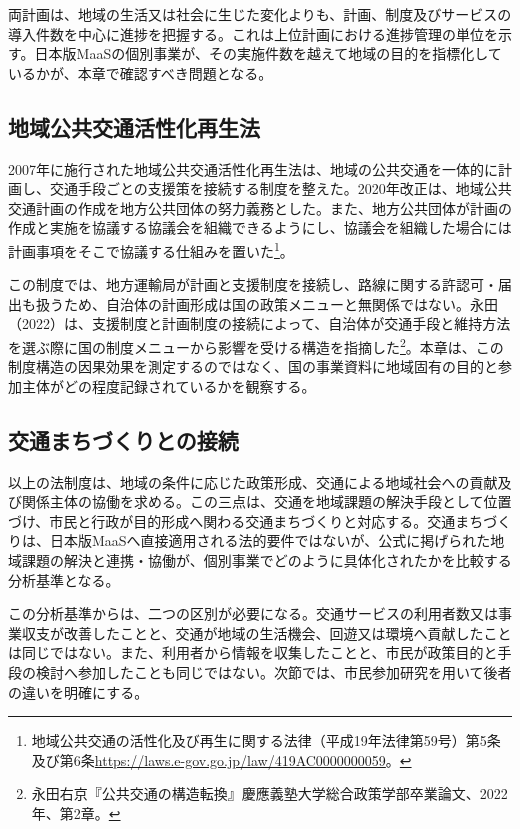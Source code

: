 両計画は、地域の生活又は社会に生じた変化よりも、計画、制度及びサービスの導入件数を中心に進捗を把握する。これは上位計画における進捗管理の単位を示す。日本版MaaSの個別事業が、その実施件数を越えて地域の目的を指標化しているかが、本章で確認すべき問題となる。

\subsection{地域公共交通活性化再生法}
\label{subsec:ch4_revitalization_law}

2007年に施行された地域公共交通活性化再生法は、地域の公共交通を一体的に計画し、交通手段ごとの支援策を接続する制度を整えた。2020年改正は、地域公共交通計画の作成を地方公共団体の努力義務とした。また、地方公共団体が計画の作成と実施を協議する協議会を組織できるようにし、協議会を組織した場合には計画事項をそこで協議する仕組みを置いた\footnote{地域公共交通の活性化及び再生に関する法律（平成19年法律第59号）第5条及び第6条\url{https://laws.e-gov.go.jp/law/419AC0000000059}。}。

この制度では、地方運輸局が計画と支援制度を接続し、路線に関する許認可・届出も扱うため、自治体の計画形成は国の政策メニューと無関係ではない。永田（2022）は、支援制度と計画制度の接続によって、自治体が交通手段と維持方法を選ぶ際に国の制度メニューから影響を受ける構造を指摘した\footnote{永田右京『公共交通の構造転換』慶應義塾大学総合政策学部卒業論文、2022年、第2章。}。本章は、この制度構造の因果効果を測定するのではなく、国の事業資料に地域固有の目的と参加主体がどの程度記録されているかを観察する。

\subsection{交通まちづくりとの接続}
\label{subsec:ch4_machizukuri}

以上の法制度は、地域の条件に応じた政策形成、交通による地域社会への貢献及び関係主体の協働を求める。この三点は、交通を地域課題の解決手段として位置づけ、市民と行政が目的形成へ関わる交通まちづくりと対応する\cite{otakatsutoshi2008machizukuri,harada2015machizukuri}。交通まちづくりは、日本版MaaSへ直接適用される法的要件ではないが、公式に掲げられた地域課題の解決と連携・協働が、個別事業でどのように具体化されたかを比較する分析基準となる。

この分析基準からは、二つの区別が必要になる。交通サービスの利用者数又は事業収支が改善したことと、交通が地域の生活機会、回遊又は環境へ貢献したことは同じではない。また、利用者から情報を収集したことと、市民が政策目的と手段の検討へ参加したことも同じではない。次節では、市民参加研究を用いて後者の違いを明確にする。


